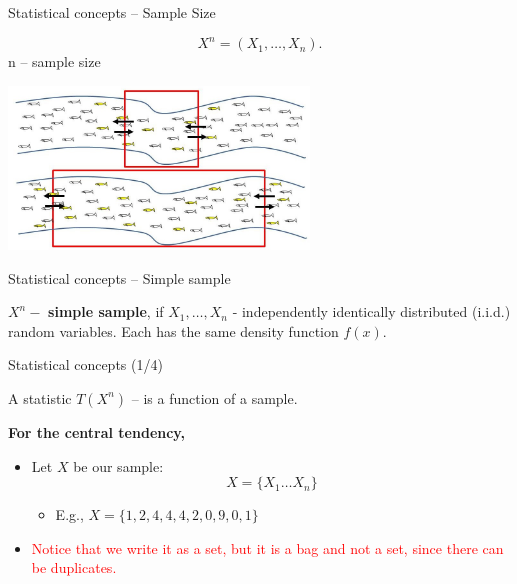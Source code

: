 \documentclass{beamer}
\begin{document}
\begin{frame}
{\centerline{Statistical concepts -- Sample Size}}

$$X^n = (X_1, \ldots, X_n).$$
\centering
n -- sample size


\begin{center}
\includegraphics[width=8cm]{A2022.IDSEPC.SperimentazioneDeduzione/figure2_mrc.jpg}
\end{center} 

\end{frame}




\begin{frame}
{\centerline{Statistical concepts -- Simple sample}}

$X^n - $ \textbf{simple sample}, if $X_1,\ldots, X_n$ - independently identically distributed (i.i.d.) random variables. Each has the same density function $f(x)$.


\end{frame}





\begin{frame}
{\centerline{Statistical concepts (1/4)}}

A statistic $T(X^n)$ -- is a function of a sample. 
\newline


\textbf{For the central tendency,} 

\begin{itemize}
\item Let $X$ be our sample:
$$X = \{ X_1 \ldots{} X_n \}$$
\begin{itemize}
\item E.g.,  $X = \{ 1, 2, 4, 4, 4, 2, 0, 9, 0, 1 \}$
\end{itemize}

\item \textcolor{red}{Notice that we write it as a set, but it is a bag and not a set, since there can be duplicates. }


\end{itemize}

\end{frame}
\end{document}

